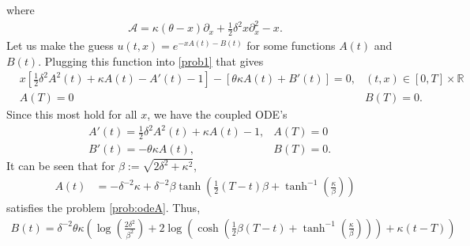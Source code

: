 \documentclass[12pt]{book}
\numberwithin{equation}{chapter}
\theoremstyle{plain}
\numberwithin{theorem}{section}
\theoremstyle{definition}
\numberwithin{exercise}{chapter}
\newcommand{\<}{\langle}
\renewcommand{\>}{\rangle}
\renewcommand{\(}{\left(}
\renewcommand{\)}{\right)}
\renewcommand{\[}{\left[}
\renewcommand{\]}{\right]}
\newcommand\Rb{\mathds{R}}
\newcommand\Ac{\mathscr{A}}
\renewcommand\d{\partial}
\newcommand\half{\frac{1}{2}}
\begin{document}
where
\begin{align}
\Ac 
	= \kappa (\theta - x) \d_x + \half \delta^2 x \d_x^2 - x.
\end{align}
Let us make the guess $u(t,x) = e^{- x A(t) - B(t)}$ for some functions $A(t)$ and $B(t)$. Plugging this function into \eqref{prob1} that gives
\begin{align}
&x \left[\half \delta ^2 A^2(t)+\kappa  A(t)-A'(t)-1\right]-\[\theta  \kappa  A(t)+B'(t)\]
	= 0, 
& (t,x) \in [0,T] \times \Rb
	\\
& A(T) 
	= 0 
& B(T)
	= 0.
\end{align}
Since this most hold for all $x$, we have the coupled ODE's
\begin{align}
&A'(t)
	=\half \delta ^2 A^2(t)+\kappa  A(t)-1,
&A(T)
	= 0 \label{prob:odeA}\\
&B'(t)
	=-\theta  \kappa  A(t),
&B(T)
	= 0.\label{prob:odeB}
\end{align}
It can be seen that for $\beta := \sqrt{ 2 \delta^2 + \kappa^2}$, 
\begin{align}
A(t) 
	&=-\delta ^{-2}\kappa +\delta ^{-2}\beta 
		\tanh \left(
			\frac{1}{2} (T-t) \beta
			+  \tanh ^{-1}\left(\frac{\kappa }{\beta}\right)
		\right)		
\end{align}
satisfies the problem \eqref{prob:odeA}. Thus,
\begin{align}
B(t) 
	= \delta^{-2} \theta  \kappa  \left(\log \left(\frac{2 \delta ^2}{\beta^2}\right)+2 
	\log \left(\cosh \left(\frac{1}{2} \beta (T-t)+ \tanh ^{-1}\left(\frac{\kappa }{\beta}\right)
	\right)\right)+\kappa  (t-T)\right)
\end{align}
\end{document}
